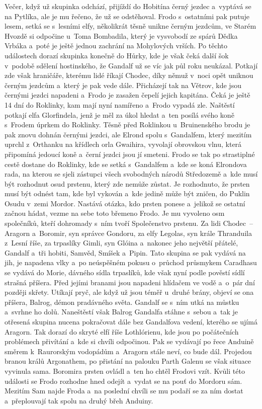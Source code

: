 {{	Večer, když už skupinka odchází, přijíždí do Hobitína černý jezdec
	a~vyptává se na Pytlíka, ale je mu řečeno, že už se odstěhoval. Frodo
	s ostatními pak putuje lesem, setká se s lesními elfy, několikrát těsně
	unikne černým jezdcům, ve Starém Hvozdě si odpočine u~Toma Bombadila, který
	je vysvobodí ze spárů Dědka Vrbáka a~poté je ještě jednou zachrání na
	Mohylových vrších. Po těchto událostech dorazí skupinka konečně do Hůrky,
	kde je však čeká další šok v podobě sdělení hostinského, že Gandalf už se
	víc jak půl roku neukázal. Potkají zde však hraničáře, kterému lidé říkají
	Chodec, díky němuž v noci opět uniknou černým jezdcům a~který je pak vede
	dále. Přicházejí tak na Větrov, kde jsou černými jezdci napadeni a~Frodo je
	zasažen čepelí jejich kapitána. Čeká je ještě 14 dní do Roklinky, kam mají
	nyní namířeno a~Frodo vypadá zle. Naštěstí potkají elfa Glorfindela, jenž
	je měl za úkol hledat a~ten posílá svého koně s Frodem úprkem do Roklinky.
	Těsně před Roklinkou u~Bruinenského brodu je pak znovu dohnán černými
	jezdci, ale Elrond spolu s Gandalfem, který mezitím uprchl z Orthanku na
	křídlech orla Gwaihira, vyvolají obrovskou vlnu, která připomíná jedoucí
	koně a~černí jezdci jsou jí smeteni. Frodo se tak po strastiplné cestě
	dostane do Roklinky, kde se setká s Gandalfem a~kde se koná Elrondova rada,
	na kterou se sjeli zástupci všech svobodných národů Středozemě a~kde musí
	být rozhodnut osud prstenu, který zde nemůže zůstat. Je rozhodnuto, že
	prsten musí být odnést tam, kde byl vykován a~kde jedině může být zničen,
	do Puklin Osudu v zemi Mordor. Nastává otázka, kdo prsten ponese a~jelikož
	se ostatní začnou hádat, vezme na sebe toto břemeno Frodo. Je mu vyvoleno
	osm společníků, kteří dohromady s ním tvoří Společenstvo prstenu. Za lidi
	Chodec~-- Aragorn a~Boromir, syn správce Gondoru, za elfy Legolas, syn
	krále Thranduila z Lesní říše, za trpaslíky Gimli, syn Glóina a~nakonec
	jeho největší přátelé, Gandalf a~tři hobiti, Samvěd, Smíšek a~Pipin. Tato
	skupina se pak vydává na jih, je napadena vlky a~po neúspěšném pokusu
	o~průchod průsmykem Caradhasu se vydává do Morie, dávného sídla trpaslíků,
	kde však nyní podle pověstí sídlí strašná příšera. Před jejími branami jsou
	napadeni hlídačem ve vodě a~o~pár dní později skřety. Utíkají pryč, ale
	když už jsou téměř u~druhé brány, objeví se ona příšera, Balrog, démon
	pradávného světa. Gandalf se s ním utká na můstku a~svrhne ho dolů.
	Naneštěstí však Balrog Gandalfa stáhne s sebou a~tak je otřesená skupina
	nucena pokračovat dále bez Gandalfova vedení, kterého se ujímá Aragorn. Tak
	dorazí do skryté elfí říše Lothlórienu, kde jsou po počátečních problémech
	přivítání a~kde si chvíli odpočinou. Pak se vydávají po řece Anduině směrem
	k Raurorským vodopádům a~Aragorn stále neví, co bude dál. Projedou branou
	králů Argonathem, po přistání na palouku Parth Galenu se však situace
	vyvinula sama. Boromira prsten ovládl a~ten ho chtěl Frodovi vzít. Kvůli
	této události se Frodo rozhodne hned odejít a~vydat se na pouť do Mordoru
	sám. Mezitím Sam najde Froda a~na poslední chvíli se mu podaří se za ním
	dostat a~přeplouvají tak spolu na druhý břeh Anduiny.
}

}
